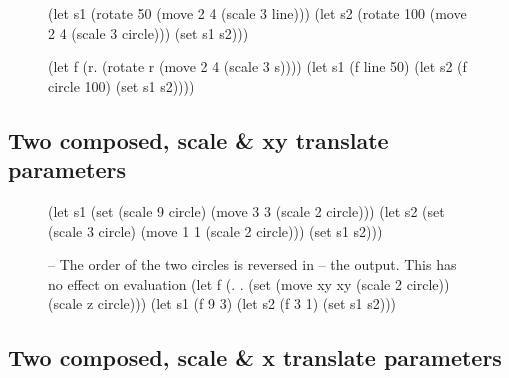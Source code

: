 \documentclass[acmsmall,nonacm]{acmart}\settopmatter{}
\begin{document}
\begin{figure}[h!]
  \begin{minipage}[c]{.5\linewidth}
    \centering
    
    \begin{nanoml}[xleftmargin=.1\textwidth]
(let s1 (rotate 50 (move 2 4 (scale 3 line)))
  (let s2 (rotate 100 (move 2 4 (scale 3 circle)))
    (set s1 s2)))
    \end{nanoml}
  \end{minipage}%
  \begin{minipage}[c]{.5\linewidth}
    \centering
    \begin{nanoml}[xleftmargin=.05\textwidth]
(let f (\s r. (rotate r (move 2 4 (scale 3 s))))
  (let s1 (f line 50)
    (let s2 (f circle 100)
      (set s1 s2))))
    \end{nanoml}
  \end{minipage}
\end{figure}

\subsection{Two composed, scale \& xy translate parameters}

\begin{figure}[h!]
  \begin{minipage}[c]{.5\linewidth}
    \centering
    
    \begin{nanoml}[xleftmargin=0]
(let s1 (set (scale 9 circle) (move 3 3 (scale 2 circle)))
  (let s2 (set (scale 3 circle) (move 1 1 (scale 2 circle)))
    (set s1 s2)))
    \end{nanoml}
  \end{minipage}%
  \begin{minipage}[c]{.5\linewidth}
    \centering
    \begin{nanoml}[xleftmargin=.1\linewidth]
-- The order of the two circles is reversed in
-- the output. This has no effect on evaluation
(let f (\xy. \z. (set
  (move xy xy (scale 2 circle)) (scale z circle)))
  (let s1 (f 9 3)
    (let s2 (f 3 1)
      (set s1 s2)))
    \end{nanoml}
  \end{minipage}
\end{figure}

\subsection{Two composed, scale \& x translate parameters}
\end{document}
